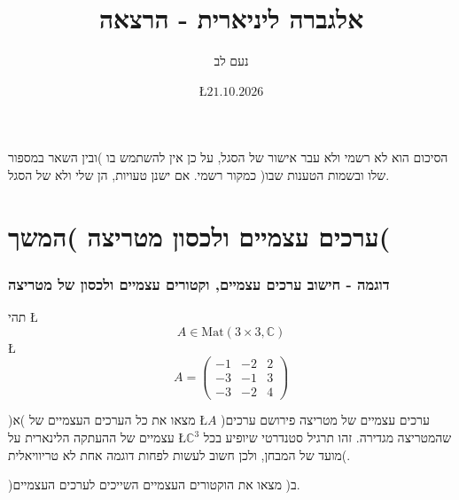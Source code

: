 \documentclass[english,hebrew]{article}
\begin{document}
\title{אלגברה ליניארית {\endL} - הרצאה {\endL}}
\author{נעם לב}
\date{\L{$21.10.2026$}}

\maketitle
\noindent{}
\begin{center}
הסיכום הוא לא רשמי ולא עבר אישור של הסגל, על כן אין להשתמש בו )ובין
השאר במספור שלו ובשמות הטענות שבו( כמקור רשמי. אם ישנן טעויות, הן
שלי ולא של הסגל.
\par\end{center}

\medskip{}

\tableofcontents{}

\newpage{}

\part{ערכים עצמיים ולכסון מטריצה )המשך(}

\section{דוגמה - חישוב ערכים עצמיים, וקטורים עצמיים ולכסון של מטריצה}

תהי \L{%
\[
A\in\text{Mat}\left(3\times3,\mathbb{C}\right)
\]
}%
\L{%
\[
A=\begin{pmatrix}-1 & -2 & 2\\
-3 & -1 & 3\\
-3 & -2 & 4
\end{pmatrix}
\]
}%

)א( מצאו את כל הערכים העצמיים של \L{$A$} )ערכים עצמיים של מטריצה
פירושם ערכים עצמיים של ההעתקה הלינארית על \L{$\mathbb{C}^{3}$} שהמטריצה
מגדירה. זהו תרגיל סטנדרטי שיופיע בכל מועד של המבחן, ולכן חשוב לעשות
לפחות דוגמה אחת לא טריוויאלית(.

)ב( מצאו את הוקטורים העצמיים השייכים לערכים העצמיים.
\end{document}
